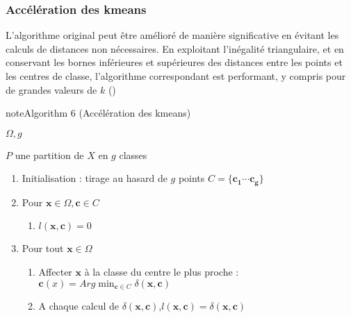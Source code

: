 \documentclass[letterpaper,10pt,french]{sphinxmanual}
\begin{document}
\subsubsection{Accélération des k\sphinxhyphen{}means}
\label{\detokenize{clustering:acceleration-des-k-means}}
\sphinxAtStartPar
L’algorithme original peut être amélioré de manière significative en évitant les calculs de distances non nécessaires. En exploitant l’inégalité triangulaire, et en conservant les bornes inférieures et supérieures des distances entre les points et les centres de classe, l’algorithme correspondant est performant, y compris pour de grandes valeurs de \(k\) ({\hyperref[\detokenize{clustering:km}]{}})
\label{clustering:km}
\begin{sphinxadmonition}{note}{Algorithm 6 (Accélération des k\sphinxhyphen{}means)}



\sphinxAtStartPar
{} \(\Omega, g\)

\sphinxAtStartPar
{} \(P\) une partition de \(X\) en \(g\) classes
\begin{enumerate}
%
\item {} 
\sphinxAtStartPar
Initialisation : tirage au hasard de \(g\) points \(C =\{\mathbf {c_1}\cdots \mathbf {c_g\}}\)

\item {} 
\sphinxAtStartPar
Pour \(\mathbf x\in \Omega,\mathbf c\in C\)
\begin{enumerate}
%
\item {} 
\sphinxAtStartPar
\(l(\mathbf x,\mathbf c)=0\)

\end{enumerate}

\item {} 
\sphinxAtStartPar
Pour tout \(\mathbf x\in \Omega\)
\begin{enumerate}
%
\item {} 
\sphinxAtStartPar
Affecter \(\mathbf x\) à la classe du centre le plus proche : \(\mathbf c(x) = Arg \displaystyle\min_{\mathbf c\in C} \delta(\mathbf x,\mathbf c)\)

\item {} 
\sphinxAtStartPar
A chaque calcul de \(\delta(\mathbf x,\mathbf c)\),\( l(\mathbf x,\mathbf c)=\delta(\mathbf x,\mathbf c)\)


\end{enumerate}
\end{enumerate}
\end{sphinxadmonition}
\end{document}

